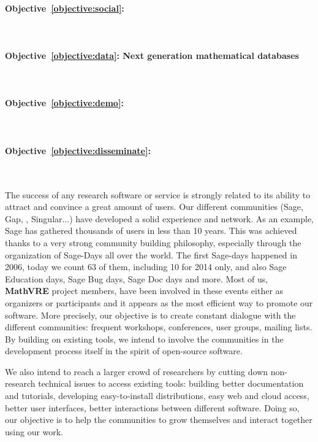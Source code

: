 \documentclass[a4paper,11pt]{article}
\newcommand{\XX}{\textbf{MathVRE}\xspace}
\newcommand{\TheProject}{\XX}
\begin{document}
\paragraph{Objective~\ref{objective:social}: }\ 

\paragraph{Objective~\ref{objective:data}: Next generation mathematical databases}\ 

\paragraph{Objective~\ref{objective:demo}: }\ 


\paragraph{Objective~\ref{objective:disseminate}: }\ 

The success of any research software or service is strongly related to its ability to attract and convince a great amount of users. Our different communities (Sage, Gap, \PariGP, Singular...) have developed a solid experience and network. As an example, Sage has gathered thousands of users in less than 10 years. This was achieved thanks to a very strong community building philosophy, especially through the organization of Sage-Days all over the world. The first Sage-days happened in 2006, today we count 63 of them, including 10 for 2014 only, and also Sage Education days, Sage Bug days, Sage Doc days and more. Most of us, \TheProject{} project members, have been involved in these events either as organizers or participants and it appears as the most efficient way to promote our software. More precisely, our objective is to create constant dialogue with the different communities: frequent workshops, conferences, user groups, mailing lists. By building on existing tools, we intend to involve the communities in the development process itself in the spirit of open-source software. 

We also intend to reach a larger crowd of researchers by cutting down non-research technical issues to access existing tools: building better documentation and tutorials, developing easy-to-install distributions, easy web and cloud access, better user interfaces, better interactions between different software. Doing so, our objective is to help the communities to grow themselves and interact together using our work. 
\end{document}
